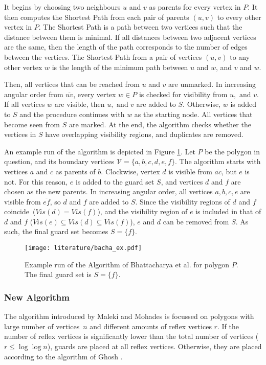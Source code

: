 It begins by choosing two neighbours $u$ and $v$ as parents for every vertex in $P$. It then computes the Shortest Path from each pair of parents $(u, v)$ to every other vertex in $P$. The Shortest Path is a path between two vertices such that the distance between them is minimal. If all distances between two adjacent vertices are the same, then the length of the path corresponds to the number of edges between the vertices. The Shortest Path from a pair of vertices $(u, v)$ to any other vertex $w$ is the length of the minimum path between $u$ and $w$, and $v$ and $w$.

Then, all vertices that can be reached from $u$ and $v$ are unmarked. In increasing angular order from $\overline{uv}$, every vertex $w \in P$ is checked for visibility from $u, \text{ and } v$. If all vertices $w$ are visible, then $u, \text{ and }v$ are added to $S$. Otherwise, $w$ is added to $S$ and the procedure continues with $w$ as the starting node. All vertices that become seen from $S$ are marked. At the end, the algorithm checks whether the vertices in $S$ have overlapping visibility regions, and duplicates are removed.

An example run of the algorithm is depicted in Figure \ref{fig:bhaca}. Let $P$ be the polygon in question, and its boundary vertices $\mathcal V = \{a, b, c, d, e, f\}$. The algorithm starts with vertices $a$ and $c$ as parents of $b$. Clockwise, vertex $d$ is visible from $\overline{ac}$, but $e$ is not. For this reason, $e$ is added to the guard set $S$, and vertices $d$ and $f$ are chosen as the new parents. In increasing angular order, all vertices $a, b, c, e$ are visible from $\overline{ef}$, so $d$ and $f$ are added to $S$. Since the visibility regions of $d$ and $f$ coincide~($\mathit{Vis}(d) = \mathit{Vis}(f)$), and the visibility region of $e$ is included in that of $d$ and $f$ ($\mathit{Vis}(e) \subseteq \mathit{Vis}(d) \subseteq \mathit{Vis}(f)$), $e$ and $d$ can be removed from $S$. As such, the final guard set becomes $S = \{f\}$.

\begin{figure}[h!]
    \centering
    \texttt{[image: literature/bacha\_ex.pdf]}
    \caption{Example run of the Algorithm of Bhattacharya et al. \cite{bhattacharya2016approximability} for polygon $P$. The final guard set is $S = \{f\}$.}
    \label{fig:bhaca}
\end{figure}

\newpage
\subsubsection{New Algorithm}
The algorithm introduced by Maleki and Mohades is focussed on polygons with large number of vertices~$n$ and different amounts of reflex vertices $r$. If the number of reflex vertices is significantly lower than the total number of vertices ($r \leq \log \log n$), guards are placed at all reflex vertices. Otherwise, they are placed according to the algorithm of Ghosh \cite{GHOSH2010718}.


